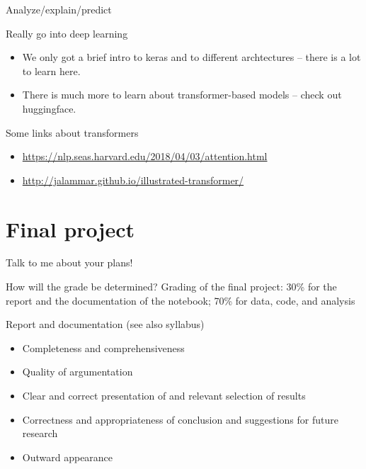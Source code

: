 \documentclass[compress]{beamer}
\begin{document}
 
\begin{frame}{Analyze/explain/predict}
	\begin{block}{Really go into deep learning}
        \begin{itemize}
		\item We only got a brief intro to keras and to different archtectures -- there is a lot to learn here.
                \item There is much more to learn about transformer-based models -- check out huggingface.
        \end{itemize}
                \end{block}
\end{frame}


\begin{frame}{Some links about transformers}
\begin{itemize}
\item \url{https://nlp.seas.harvard.edu/2018/04/03/attention.html}
\item \url{http://jalammar.github.io/illustrated-transformer/}
\end{itemize}
\end{frame}


\section{Final project}

\begin{frame}[standout]
Talk to me about your plans!
\end{frame}

\begin{frame}{How will the grade be determined?}
Grading of the final project: 30\% for the report and the documentation of the notebook; 70\% for data, code, and analysis

\pause

\begin{block}{Report and documentation}
(see also syllabus)
\footnotesize
\begin{itemize}
\item Completeness and comprehensiveness
\item Quality of argumentation
\item Clear and correct presentation of and relevant selection of results
\item Correctness and appropriateness of conclusion and suggestions for future research
\item Outward appearance
\end{itemize}
\end{block}

\end{frame}
\end{document}
